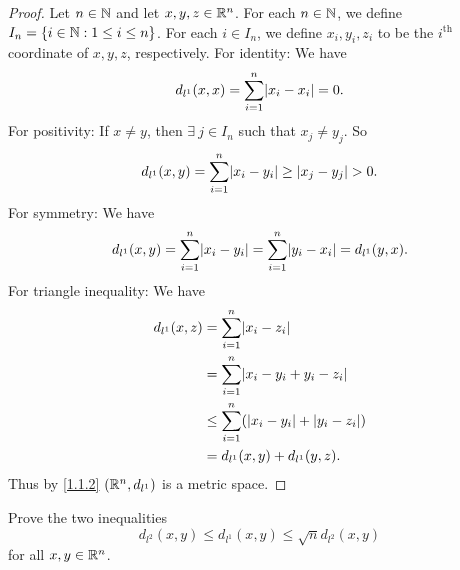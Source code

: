 \begin{proof}
  Let \(n \in \mathbb{N}\) and let \(x, y, z \in \mathbb{R}^n\).
  For each \(n \in \mathbb{N}\), we define \(I_n = \{i \in \mathbb{N} : 1 \leq i \leq n\}\).
  For each \(i \in I_n\), we define \(x_i, y_i, z_i\) to be the \(i^{\text{th}}\) coordinate of \(x, y, z\), respectively.
  For identity:
  We have
  \[
    d_{l^1}(x, x) = \sum_{i = 1}^n \abs{x_i - x_i} = 0.
  \]
  For positivity:
  If \(x \neq y\), then \(\exists\ j \in I_n\) such that \(x_j \neq y_j\).
  So
  \[
    d_{l^1}(x, y) = \sum_{i = 1}^n \abs{x_i - y_i} \geq \abs{x_j - y_j} > 0.
  \]
  For symmetry:
  We have
  \[
    d_{l^1}(x, y) = \sum_{i = 1}^n \abs{x_i - y_i} = \sum_{i = 1}^n \abs{y_i - x_i} = d_{l^1}(y, x).
  \]
  For triangle inequality:
  We have
  \begin{align*}
    d_{l^1}(x, z) & = \sum_{i = 1}^n \abs{x_i - z_i}                        \\
                  & = \sum_{i = 1}^n \abs{x_i - y_i + y_i - z_i}            \\
                  & \leq \sum_{i = 1}^n (\abs{x_i - y_i} + \abs{y_i - z_i}) \\
                  & = d_{l^1}(x, y) + d_{l^1}(y, z).
  \end{align*}
  Thus by \cref{1.1.2} \((\mathbb{R}^n, d_{l^1})\) is a metric space.
\end{proof}

\begin{ex}\label{ex:1.1.8}
  Prove the two inequalities
  \[
    d_{l^2}(x, y) \leq d_{l^1}(x, y) \leq \sqrt{n} d_{l^2}(x, y)
  \]
  for all \(x, y \in \mathbb{R}^n\).
\end{ex}

